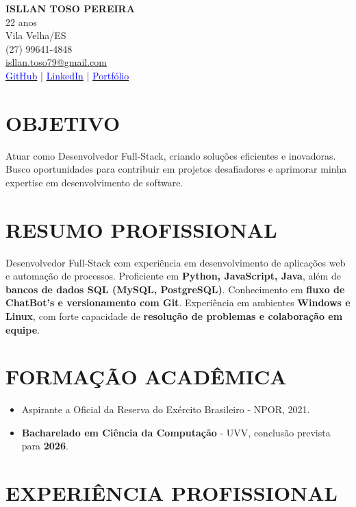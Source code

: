 \documentclass[a4paper,10pt]{article}
\begin{document}
\begin{center}
    {\LARGE \textbf{ISLLAN TOSO PEREIRA}} \\
    22 anos \\
    Vila Velha/ES \\
    (27) 99641-4848 \\
    \href{mailto:isllan.toso79@gmail.com}{isllan.toso79@gmail.com} \\
    \href{https://github.com/Isllanrx}{\textcolor{blue}{GitHub}} | 
    \href{http://linkedin.com/in/isllantoso}{\textcolor{blue}{LinkedIn}} | 
    \href{https://port-isllan.vercel.app/}{\textcolor{blue}{Portfólio}}
\end{center} 

\section{OBJETIVO}
Atuar como Desenvolvedor Full-Stack, criando soluções eficientes e inovadoras. Busco oportunidades para contribuir em projetos desafiadores e aprimorar minha expertise em desenvolvimento de software. 

\section{RESUMO PROFISSIONAL}
Desenvolvedor Full-Stack com experiência em desenvolvimento de aplicações web e automação de processos. Proficiente em \textbf{Python, JavaScript, Java}, além de \textbf{bancos de dados SQL (MySQL, PostgreSQL)}. Conhecimento em \textbf{fluxo de ChatBot’s e versionamento com Git}. Experiência em ambientes \textbf{Windows e Linux}, com forte capacidade de \textbf{resolução de problemas e colaboração em equipe}.

\section{FORMAÇÃO ACADÊMICA}
\begin{itemize}
    \item Aspirante a Oficial da Reserva do Exército Brasileiro - NPOR, 2021.
    \item \textbf{Bacharelado em Ciência da Computação} - UVV, conclusão prevista para \textbf{2026}.
\end{itemize}

\section{EXPERIÊNCIA PROFISSIONAL}
\end{document}
